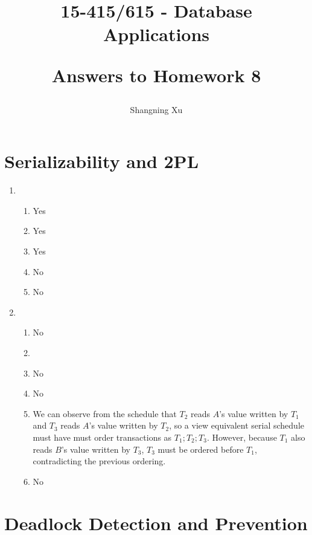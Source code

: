 \documentclass{homework}
\title{
    15-415/615 - Database Applications

    Answers to Homework 8
}
\author{Shangning Xu}
\begin{document}
\maketitle

\section{Serializability and 2PL}

\begin{enumerate}
    \item \begin{enumerate}
        \item Yes
        \item Yes
        \item Yes
        \item No
        \item No
    \end{enumerate}

    \item \begin{enumerate}
        \item No
        \item {}
        \item No
        \item No
        \item We can observe from the schedule that $T_2$ reads $A$'s value written by $T_1$ and $T_3$ reads $A$'s value written by $T_2$, so a view equivalent serial schedule must have must order transactions as $T_1;T_2;T_3$. However, because $T_1$ also reads $B$'s value written by $T_3$, $T_3$ must be ordered before $T_1$, contradicting the previous ordering.
        \item No
    \end{enumerate}
\end{enumerate}

\section{Deadlock Detection and Prevention}
\end{document}
